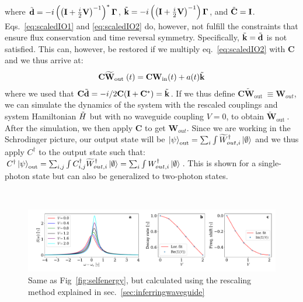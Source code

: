 where $\Tilde{\mathbf{d}} = -i \left(\left(\mathbf{I}+\frac{i}{2} \mathbf{V}\right)^{-1} \right)^* \mathbf{\Gamma}$, $\Tilde{\mathbf{k}} = -i \left(\left(\mathbf{I}+\frac{i}{2} \mathbf{V}\right)^{-1} \right) \mathbf{\Gamma}$, and $\Tilde{\mathbf{C}} = \mathbf{I}$. Eqs.~\eqref{eq:scaledIO1} and \eqref{eq:scaledIO2} do, however, not fulfill the constraints that ensure flux conservation and time reversal symmetry. Specifically, $\Tilde{\mathbf{k}} = \Tilde{\mathbf{d}}$ is not satisfied. This can, however, be restored if we multiply eq.~\eqref{eq:scaledIO2} with $\mathbf{C}$ and we thus arrive at:
\begin{align}
\mathbf{C} \widetilde{\mathbf{W}}_{\text {out }}(t)= \mathbf{C} \mathbf{W}_{\mathrm{in}}(t)+a(t)\Tilde{\mathbf{k}}
\end{align}
where we used that $\mathbf{C} \Tilde{\mathbf{d}} = - i/2 \mathbf{C} (\mathbf{I}+\mathbf{C}^*) = \Tilde{\mathbf{k}}$. If we thus define $\mathbf{C} \widetilde{\mathbf{W}}_{\text {out }} \equiv \mathbf{W}_{out}$, we can simulate the dynamics of the system with the rescaled couplings and system Hamiltonian $\Tilde{H}$ but with no waveguide coupling $V=0$, to obtain $\widetilde{\mathbf{W}}_{\text {out }}$. After the simulation, we then apply $\mathbf{C}$ to get $\mathbf{W}_{out}$. Since we are working in the Schrodinger picture, our output state will be $\ket{\psi}_{\mathrm{out}} = \sum_i \int \widetilde{W}_{out,i}^\dagger \ket{\emptyset}$ and we thus apply $C^\dagger$ to the output state such that: $C^\dagger \ket{\psi}_{\mathrm{out}} = \sum_{i,j} \int C_{i,j}^\dagger \widetilde{W}_{out,i}^\dagger \ket{\emptyset} = \sum_i \int W_{out,i}^\dagger \ket{\emptyset}$. This is shown for a single-photon state but can also be generalized to two-photon states.

\

\begin{figure}
    \centering
    \includegraphics[width = \linewidth]{figures/fanoressonanceIO.pdf}
    \caption{Same as Fig~\ref{fig:selfenergy}, but calculated using the rescaling method explained in sec.~\ref{sec:inferringwaveguide}}
    \label{fig:DecayIO}
\end{figure}

